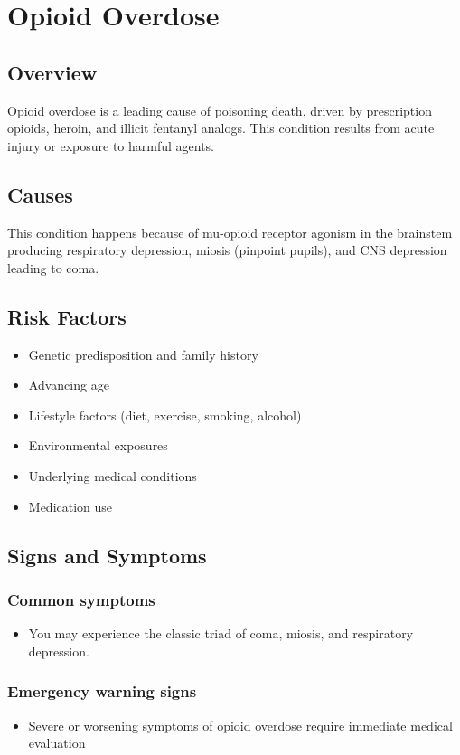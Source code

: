 \chapter{Opioid Overdose}
\label{sec:Opioid Overdose}

\section{Overview}
Opioid overdose is a leading cause of poisoning death, driven by prescription opioids, heroin, and illicit fentanyl analogs. This condition results from acute injury or exposure to harmful agents.
\section{Causes}
This condition happens because of mu-opioid receptor agonism in the brainstem producing respiratory depression, miosis (pinpoint pupils), and CNS depression leading to coma.     
\section{Risk Factors}

\begin{itemize}[noitemsep]
  \item Genetic predisposition and family history
  \item Advancing age
  \item Lifestyle factors (diet, exercise, smoking, alcohol)
  \item Environmental exposures
  \item Underlying medical conditions
  \item Medication use
\end{itemize}
\section{Signs and Symptoms}

\subsection{Common symptoms}
\begin{itemize}[noitemsep]
  \item You may experience the classic triad of coma, miosis, and respiratory depression. 
  \end{itemize}

\subsection{Emergency warning signs}
\begin{itemize}[noitemsep]
  \item Severe or worsening symptoms of opioid overdose require immediate medical evaluation
\end{itemize}
